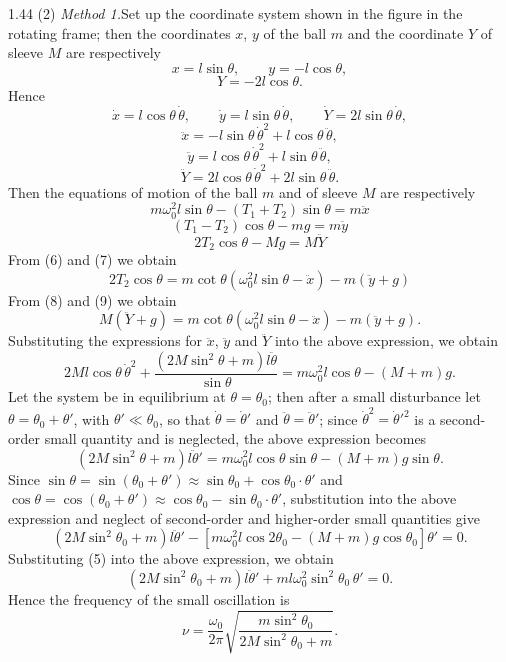 \begin{solution}{1.44}
(2) \textit{Method 1.}\quad Set up the coordinate system shown in the figure in the rotating frame; then the coordinates $x$, $y$ of the ball $m$ and the coordinate $Y$ of sleeve $M$ are respectively
\[
x=l\sin\theta,\qquad y=-l\cos\theta,
\]
\[
Y=-2l\cos\theta.
\]
Hence
\[
\dot x=l\cos\theta\,\dot\theta,\qquad \dot y=l\sin\theta\,\dot\theta,\qquad \dot Y=2l\sin\theta\,\dot\theta,
\]
\[
\ddot x=-l\sin\theta\,\dot\theta^2+l\cos\theta\,\ddot\theta,
\]
\[
\ddot y=l\cos\theta\,\dot\theta^2+l\sin\theta\,\ddot\theta,
\]
\[
\ddot Y=2l\cos\theta\,\dot\theta^2+2l\sin\theta\,\ddot\theta.
\]
Then the equations of motion of the ball $m$ and of sleeve $M$ are respectively
\begin{equation}
m\omega_0^2l\sin\theta-(T_1+T_2)\sin\theta=m\ddot x \tag{6}
\end{equation}
\begin{equation}
(T_1-T_2)\cos\theta-mg=m\ddot y \tag{7}
\end{equation}
\begin{equation}
2T_2\cos\theta-Mg=M\ddot Y \tag{8}
\end{equation}
From (6) and (7) we obtain
\begin{equation}
2T_2\cos\theta=m\cot\theta\left(\omega_0^2l\sin\theta-\ddot x\right)-m(\ddot y+g) \tag{9}
\end{equation}
From (8) and (9) we obtain
\[
M(\ddot Y+g)=m\cot\theta\left(\omega_0^2l\sin\theta-\ddot x\right)-m(\ddot y+g).
\]
Substituting the expressions for $\ddot x$, $\ddot y$ and $\ddot Y$ into the above expression, we obtain
\[
2Ml\cos\theta\,\dot\theta^2+\frac{(2M\sin^2\theta+m)l\ddot\theta}{\sin\theta}=m\omega_0^2l\cos\theta-(M+m)g.
\]
Let the system be in equilibrium at $\theta=\theta_0$; then after a small disturbance let $\theta=\theta_0+\theta'$, with $\theta'\ll\theta_0$, so that $\dot\theta=\dot\theta'$ and $\ddot\theta=\ddot\theta'$; since $\dot\theta^2=\dot\theta'^2$ is a second-order small quantity and is neglected, the above expression becomes
\[
(2M\sin^2\theta+m)l\ddot\theta'=m\omega_0^2l\cos\theta\sin\theta-(M+m)g\sin\theta.
\]
Since $\sin\theta=\sin(\theta_0+\theta')\approx\sin\theta_0+\cos\theta_0\cdot\theta'$ and $\cos\theta=\cos(\theta_0+\theta')\approx\cos\theta_0-\sin\theta_0\cdot\theta'$, substitution into the above expression and neglect of second-order and higher-order small quantities give
\[
(2M\sin^2\theta_0+m)l\ddot\theta'-\left[m\omega_0^2l\cos2\theta_0-(M+m)g\cos\theta_0\right]\theta'=0.
\]
Substituting (5) into the above expression, we obtain
\[
(2M\sin^2\theta_0+m)l\ddot\theta'+ml\omega_0^2\sin^2\theta_0\,\theta'=0.
\]
Hence the frequency of the small oscillation is
\[
\nu=\frac{\omega_0}{2\pi}\sqrt{\frac{m\sin^2\theta_0}{2M\sin^2\theta_0+m}}.
\]


\end{solution}
